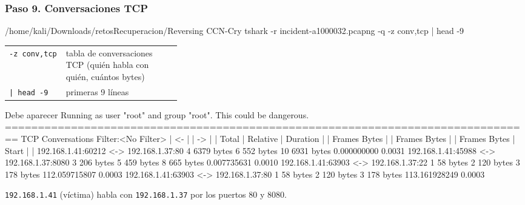 \documentclass[11pt,a4paper]{article}
\begin{document}
\subsubsection*{Paso 9. Conversaciones TCP}
\begin{comando}{/home/kali/Downloads/retosRecuperacion/Reversing CCN-Cry}
tshark -r incident-a1000032.pcapng -q -z conv,tcp | head -9
\end{comando}
\begin{tcolorbox}[enhanced, breakable, colback=gray!3, colframe=gray!35, boxrule=0.3pt, arc=1pt, left=4pt, right=4pt, top=2pt, bottom=2pt, fonttitle=\sffamily\scriptsize\bfseries, coltitle=black!70, colbacktitle=gray!10, title={Qué hace cada parte}, attach title to upper, before skip=2pt, after skip=4pt, fontupper=\small]
\par{\renewcommand{\arraystretch}{1.12}\begin{tabularx}{\linewidth}{@{}>{\raggedright\arraybackslash}p{0.33\linewidth}>{\raggedright\arraybackslash}X@{}}
\texttt{-z conv,\allowbreak{}tcp} & tabla de conversaciones TCP (quién habla con quién, cuántos bytes) \\
\texttt{|\allowbreak{} head -9} & primeras 9 líneas \\
\end{tabularx}}
\end{tcolorbox}
\begin{salida}{Debe aparecer}
Running as user "root" and group "root". This could be dangerous.
================================================================================
TCP Conversations
Filter:<No Filter>
                                                           |       <-      | |       ->      | |     Total     |    Relative    |   Duration   |
                                                           | Frames  Bytes | | Frames  Bytes | | Frames  Bytes |      Start     |              |
192.168.1.41:60212         <-> 192.168.1.37:80                  4 6379 bytes       6 552 bytes      10 6931 bytes     0.000000000         0.0031
192.168.1.41:45988         <-> 192.168.1.37:8080                3 206 bytes       5 459 bytes       8 665 bytes     0.007735631         0.0010
192.168.1.41:63903         <-> 192.168.1.37:22                  1 58 bytes        2 120 bytes       3 178 bytes   112.059715807         0.0003
192.168.1.41:63903         <-> 192.168.1.37:80                  1 58 bytes        2 120 bytes       3 178 bytes   113.161928249         0.0003
\end{salida}
\begin{nota}\texttt{192.168.1.41} (víctima) habla con \texttt{192.168.1.37} por los puertos 80 y 8080.\end{nota}
\end{document}

